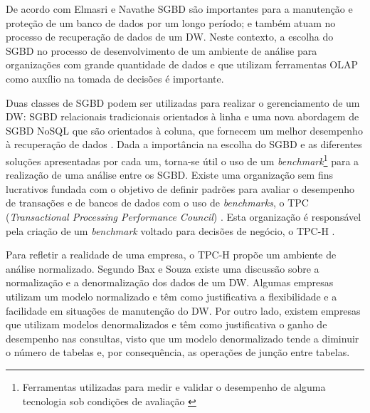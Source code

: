 De acordo com Elmasri e Navathe \cite{navathe2011banco} SGBD são importantes para a manutenção 
e proteção de um banco de dados por um longo período; e também atuam no processo de recuperação de dados de um DW. Neste contexto, 
a escolha do SGBD no processo de desenvolvimento de um ambiente de análise para organizações com grande quantidade de dados e que utilizam ferramentas OLAP 
como auxílio na tomada de decisões é importante. 

Duas classes de SGBD podem ser utilizadas para realizar o gerenciamento de um DW: SGBD relacionais tradicionais orientados à linha e uma nova abordagem de SGBD 
NoSQL que são orientados à coluna, que fornecem um melhor desempenho à recuperação de dados \cite{good2017column}. 
Dada a importância na escolha do SGBD e as diferentes soluções apresentadas por cada um, torna-se útil o uso de um 
\textit{benchmark}\footnote{Ferramentas utilizadas para medir e validar o desempenho de alguma tecnologia sob condições de avaliação \cite{bouckaert2010benchmarking}} 
para a realização de uma análise entre os SGBD. Existe uma organização sem fins lucrativos fundada com o objetivo de definir padrões para avaliar o 
desempenho de transações e de bancos de dados com o uso de \textit{benchmarks}, o TPC (\textit{Transactional Processing Performance Council}) \cite{tpc2017page}. 
Esta organização é responsável pela criação de um \textit{benchmark} voltado para decisões de negócio, o TPC-H \cite{tpch2017page}.

Para refletir a realidade de uma empresa, o TPC-H propõe um ambiente de análise normalizado. Segundo Bax e Souza \cite{bax2003modelagem} 
existe uma discussão sobre a normalização e a denormalização dos dados de um DW. Algumas empresas utilizam um modelo normalizado e têm como 
justificativa a flexibilidade e a facilidade em situações de manutenção do DW. Por outro lado, existem empresas que utilizam modelos denormalizados 
e têm como justificativa o ganho de desempenho nas consultas, visto que um modelo denormalizado tende a diminuir o número de tabelas e, por consequência, 
as operações de junção entre tabelas. 

